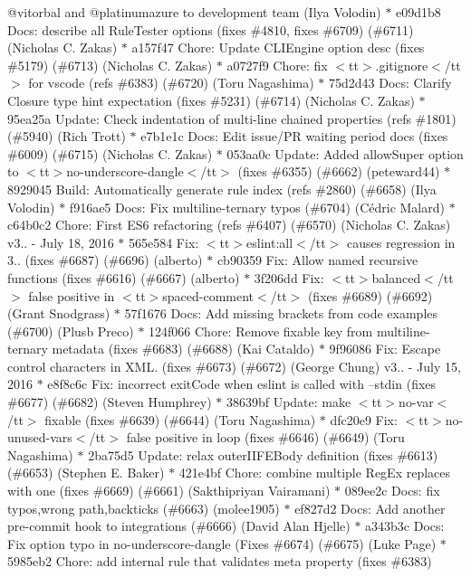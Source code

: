 \begin{DoxyItemize}
@vitorbal and @platinumazure to development team (\+Ilya Volodin) \texorpdfstring{$\ast$}{*} e09d1b8 Docs\+: describe all Rule\+Tester options (fixes \#4810, fixes \#6709) (\#6711) (\+Nicholas C. Zakas) \texorpdfstring{$\ast$}{*} a157f47 Chore\+: Update CLIEngine option desc (fixes \#5179) (\#6713) (\+Nicholas C. Zakas) \texorpdfstring{$\ast$}{*} a0727f9 Chore\+: fix $<$tt$>$.\+gitignore$<$/tt$>$ for vscode (refs \#6383) (\#6720) (\+Toru Nagashima) \texorpdfstring{$\ast$}{*} 75d2d43 Docs\+: Clarify Closure type hint expectation (fixes \#5231) (\#6714) (\+Nicholas C. Zakas) \texorpdfstring{$\ast$}{*} 95ea25a Update\+: Check indentation of multi-\/line chained properties (refs \#1801) (\#5940) (\+Rich Trott) \texorpdfstring{$\ast$}{*} e7b1e1c Docs\+: Edit issue/\+PR waiting period docs (fixes \#6009) (\#6715) (\+Nicholas C. Zakas) \texorpdfstring{$\ast$}{*} 053aa0c Update\+: Added \textquotesingle{}allow\+Super\textquotesingle{} option to $<$tt$>$no-\/underscore-\/dangle$<$/tt$>$ (fixes \#6355) (\#6662) (peteward44) \texorpdfstring{$\ast$}{*} 8929045 Build\+: Automatically generate rule index (refs \#2860) (\#6658) (\+Ilya Volodin) \texorpdfstring{$\ast$}{*} f916ae5 Docs\+: Fix multiline-\/ternary typos (\#6704) (\+Cédric Malard) \texorpdfstring{$\ast$}{*} c64b0c2 Chore\+: First ES6 refactoring (refs \#6407) (\#6570) (\+Nicholas C. Zakas)  v3.. -\/ July 18, 2016  \texorpdfstring{$\ast$}{*} 565e584 Fix\+: $<$tt$>$eslint\+:all$<$/tt$>$ causes regression in 3.. (fixes \#6687) (\#6696) (alberto) \texorpdfstring{$\ast$}{*} cb90359 Fix\+: Allow named recursive functions (fixes \#6616) (\#6667) (alberto) \texorpdfstring{$\ast$}{*} 3f206dd Fix\+: $<$tt$>$balanced$<$/tt$>$ false positive in $<$tt$>$spaced-\/comment$<$/tt$>$ (fixes \#6689) (\#6692) (\+Grant Snodgrass) \texorpdfstring{$\ast$}{*} 57f1676 Docs\+: Add missing brackets from code examples (\#6700) (\+Plusb Preco) \texorpdfstring{$\ast$}{*} 124f066 Chore\+: Remove fixable key from multiline-\/ternary metadata (fixes \#6683) (\#6688) (\+Kai Cataldo) \texorpdfstring{$\ast$}{*} 9f96086 Fix\+: Escape control characters in XML. (fixes \#6673) (\#6672) (\+George Chung)  v3.. -\/ July 15, 2016  \texorpdfstring{$\ast$}{*} e8f8c6c Fix\+: incorrect exit\+Code when eslint is called with --stdin (fixes \#6677) (\#6682) (\+Steven Humphrey) \texorpdfstring{$\ast$}{*} 38639bf Update\+: make $<$tt$>$no-\/var$<$/tt$>$ fixable (fixes \#6639) (\#6644) (\+Toru Nagashima) \texorpdfstring{$\ast$}{*} dfc20e9 Fix\+: $<$tt$>$no-\/unused-\/vars$<$/tt$>$ false positive in loop (fixes \#6646) (\#6649) (\+Toru Nagashima) \texorpdfstring{$\ast$}{*} 2ba75d5 Update\+: relax outer\+IIFEBody definition (fixes \#6613) (\#6653) (\+Stephen E. Baker) \texorpdfstring{$\ast$}{*} 421e4bf Chore\+: combine multiple Reg\+Ex replaces with one (fixes \#6669) (\#6661) (\+Sakthipriyan Vairamani) \texorpdfstring{$\ast$}{*} 089ee2c Docs\+: fix typos,wrong path,backticks (\#6663) (molee1905) \texorpdfstring{$\ast$}{*} ef827d2 Docs\+: Add another pre-\/commit hook to integrations (\#6666) (\+David Alan Hjelle) \texorpdfstring{$\ast$}{*} a343b3c Docs\+: Fix option typo in no-\/underscore-\/dangle (\+Fixes \#6674) (\#6675) (\+Luke Page) \texorpdfstring{$\ast$}{*} 5985eb2 Chore\+: add internal rule that validates meta property (fixes \#6383) 
\end{DoxyItemize}
